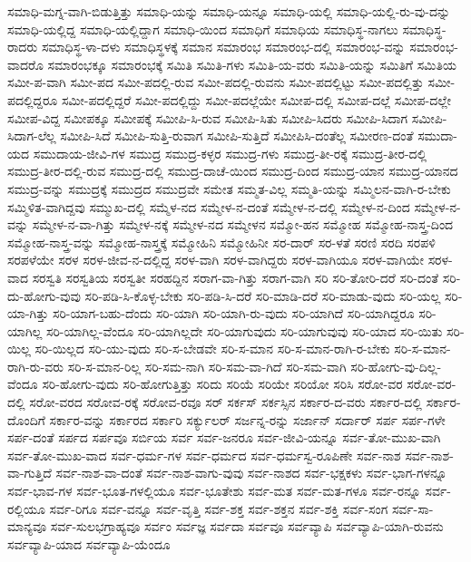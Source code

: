 {ಸಮಾಧಿ-ಮಗ್ನ-ವಾಗಿ-ಬಿಡುತ್ತಿತ್ತು
ಸಮಾಧಿ-ಯನ್ನು
ಸಮಾಧಿ-ಯನ್ನೂ
ಸಮಾಧಿ-ಯಲ್ಲಿ
ಸಮಾಧಿ-ಯಲ್ಲಿ-ರು-ವು-ದನ್ನು
ಸಮಾಧಿ-ಯಲ್ಲಿದ್ದ
ಸಮಾಧಿ-ಯಲ್ಲಿದ್ದಾಗ
ಸಮಾಧಿ-ಯಿಂದ
ಸಮಾಧಿಗೆ
ಸಮಾಧಿಯ
ಸಮಾಧಿಸ್ಥ-ನಾಗಲು
ಸಮಾಧಿಸ್ಥ-ರಾದರು
ಸಮಾಧಿಸ್ಥ-ಳಾ-ದಳು
ಸಮಾಧಿಸ್ಥಳಕ್ಕೆ
ಸಮಾನ
ಸಮಾರಂಭ
ಸಮಾರಂಭ-ದಲ್ಲಿ
ಸಮಾರಂಭ-ವನ್ನು
ಸಮಾರಂಭ-ವಾದರೊ
ಸಮಾರಂಭಕ್ಕೂ
ಸಮಾರಂಭಕ್ಕೆ
ಸಮಿತಿ
ಸಮಿತಿ-ಗಳು
ಸಮಿತಿ-ಯ-ವರು
ಸಮಿತಿ-ಯನ್ನು
ಸಮಿತಿಗೆ
ಸಮಿತಿಯ
ಸಮೀ-ಪ-ವಾಗಿ
ಸಮೀ-ಪದ
ಸಮೀ-ಪದಲ್ಲಿ-ರುವ
ಸಮೀ-ಪದಲ್ಲಿ-ರುವನು
ಸಮೀ-ಪದಲ್ಲಿಟ್ಟು
ಸಮೀ-ಪದಲ್ಲಿತ್ತು
ಸಮೀ-ಪದಲ್ಲಿದ್ದರೂ
ಸಮೀ-ಪದಲ್ಲಿದ್ದರೆ
ಸಮೀ-ಪದಲ್ಲಿದ್ದು
ಸಮೀ-ಪದಲ್ಲೆಯೇ
ಸಮೀಪ-ದಲ್ಲಿ
ಸಮೀಪ-ದಲ್ಲೆ
ಸಮೀಪ-ದಲ್ಲೇ
ಸಮೀಪ-ವಿದ್ದ
ಸಮೀಪಕ್ಕೂ
ಸಮೀಪಕ್ಕೆ
ಸಮೀಪಿ-ಸಿ-ರುವ
ಸಮೀಪಿ-ಸಿತು
ಸಮೀಪಿ-ಸಿದರು
ಸಮೀಪಿ-ಸಿದಾಗ
ಸಮೀಪಿ-ಸಿದಾಗ-ಲೆಲ್ಲ
ಸಮೀಪಿ-ಸಿದೆ
ಸಮೀಪಿ-ಸುತ್ತಿ-ರುವಾಗ
ಸಮೀಪಿ-ಸುತ್ತಿದೆ
ಸಮೀಪಿಸಿ-ದಂತೆಲ್ಲ
ಸಮೀರಣ-ದಂತೆ
ಸಮುದಾ-ಯದ
ಸಮುದಾಯ-ಜೀವಿ-ಗಳ
ಸಮುದ್ರ
ಸಮುದ್ರ-ಕಳ್ಳರ
ಸಮುದ್ರ-ಗಳು
ಸಮುದ್ರ-ತೀ-ರಕ್ಕೆ
ಸಮುದ್ರ-ತೀರ-ದಲ್ಲಿ
ಸಮುದ್ರ-ತೀರ-ದಲ್ಲಿ-ರುವ
ಸಮುದ್ರ-ದಲ್ಲಿ
ಸಮುದ್ರ-ದಾಚೆ-ಯಿಂದ
ಸಮುದ್ರ-ದಿಂದ
ಸಮುದ್ರ-ಯಾನ
ಸಮುದ್ರ-ಯಾನದ
ಸಮುದ್ರ-ವನ್ನು
ಸಮುದ್ರಕ್ಕೆ
ಸಮುದ್ರದ
ಸಮುದ್ರವೇ
ಸಮೇತ
ಸಮ್ಮತ-ವಿಲ್ಲ
ಸಮ್ಮತಿ-ಯನ್ನು
ಸಮ್ಮಿಲನ-ವಾಗಿ-ರ-ಬೇಕು
ಸಮ್ಮಿಳಿತ-ವಾಗಿದ್ದವು
ಸಮ್ಮುಖ-ದಲ್ಲಿ
ಸಮ್ಮೆಳ-ನದ
ಸಮ್ಮೇಳ-ನ-ದಂತೆ
ಸಮ್ಮೇಳ-ನ-ದಲ್ಲಿ
ಸಮ್ಮೇಳ-ನ-ದಿಂದ
ಸಮ್ಮೇಳ-ನ-ವನ್ನು
ಸಮ್ಮೇಳ-ನ-ವಾ-ಗಿತ್ತು
ಸಮ್ಮೇಳ-ನಕ್ಕೆ
ಸಮ್ಮೇಳ-ನದ
ಸಮ್ಮೇಳನ
ಸಮ್ಮೋ-ಹನ
ಸಮ್ಮೋಹ
ಸಮ್ಮೋಹ-ನಾಸ್ತ್ರ-ದಿಂದ
ಸಮ್ಮೋಹ-ನಾಸ್ತ್ರ-ವನ್ನು
ಸಮ್ಮೋಹ-ನಾಸ್ತ್ರಕ್ಕೆ
ಸಮ್ಮೋಹಿನಿ
ಸಮ್ಮೋಹಿನೀ
ಸರ-ದಾರ್
ಸರ-ಳತೆ
ಸರಣಿ
ಸರದಿ
ಸರಪಳಿ
ಸರಪಳೆಯೇ
ಸರಳ
ಸರಳ-ಜೀವ-ನ-ದಲ್ಲಿದ್ದ
ಸರಳ-ವಾಗಿ
ಸರಳ-ವಾಗಿದ್ದರು
ಸರಳ-ವಾಗಿಯೂ
ಸರಳ-ವಾಗಿಯೇ
ಸರಳ-ವಾದ
ಸರಸ್ವತಿ
ಸರಸ್ವತಿಯ
ಸರಸ್ವತೀ
ಸರಹದ್ದಿನ
ಸರಾಗ-ವಾ-ಗಿತ್ತು
ಸರಾಗ-ವಾಗಿ
ಸರಿ
ಸರಿ-ತೋರಿ-ದರೆ
ಸರಿ-ದಂತೆ
ಸರಿ-ದು-ಹೋಗು-ವುವು
ಸರಿ-ಪಡಿ-ಸಿ-ಕೊಳ್ಳ-ಬೇಕು
ಸರಿ-ಪಡಿ-ಸಿ-ದರೆ
ಸರಿ-ಮಾಡಿ-ದರೆ
ಸರಿ-ಮಾಡು-ವುದು
ಸರಿ-ಯಲ್ಲ
ಸರಿ-ಯಾ-ಗಿತ್ತು
ಸರಿ-ಯಾಗ-ಬಹು-ದೆಂದು
ಸರಿ-ಯಾಗಿ
ಸರಿ-ಯಾಗಿ-ರು-ವುದು
ಸರಿ-ಯಾಗಿದೆ
ಸರಿ-ಯಾಗಿದ್ದರೂ
ಸರಿ-ಯಾಗಿಲ್ಲ
ಸರಿ-ಯಾಗಿಲ್ಲ-ವೆಂದೂ
ಸರಿ-ಯಾಗಿಲ್ಲದೇ
ಸರಿ-ಯಾಗುವುದು
ಸರಿ-ಯಾಗುವುವು
ಸರಿ-ಯಾದ
ಸರಿ-ಯಿತು
ಸರಿ-ಯಿಲ್ಲ
ಸರಿ-ಯಿಲ್ಲದ
ಸರಿ-ಯು-ವುದು
ಸರಿ-ಸ-ಬೇಡವೇ
ಸರಿ-ಸ-ಮಾನ
ಸರಿ-ಸ-ಮಾನ-ರಾಗಿ-ರ-ಬೇಕು
ಸರಿ-ಸ-ಮಾನ-ರಾಗಿ-ರು-ವರು
ಸರಿ-ಸ-ಮಾನ-ರಿಲ್ಲ
ಸರಿ-ಸಮ-ನಾಗಿ
ಸರಿ-ಸಮ-ವಾ-ಗಿದೆ
ಸರಿ-ಸಮ-ವಾಗಿ
ಸರಿ-ಹೋಗು-ವು-ದಿಲ್ಲ-ವೆಂದೂ
ಸರಿ-ಹೋಗು-ವುದು
ಸರಿ-ಹೋಗುತ್ತಿತ್ತು
ಸರಿದು
ಸರಿಯೆ
ಸರಿಯೇ
ಸರಿಯೋ
ಸರಿಸಿ
ಸರೋ-ವರ
ಸರೋ-ವರ-ದಲ್ಲಿ
ಸರೋ-ವರದ
ಸರೋವ-ರಕ್ಕೆ
ಸರೋವ-ರವೂ
ಸರ್
ಸರ್ಕಸ್
ಸರ್ಕಸ್ಸಿನ
ಸರ್ಕಾರ-ದ-ವರು
ಸರ್ಕಾರ-ದಲ್ಲಿ
ಸರ್ಕಾರ-ದೊಂದಿಗೆ
ಸರ್ಕಾರ-ವನ್ನು
ಸರ್ಕಾರದ
ಸರ್ಕಾರಿ
ಸರ್ಕ್ಯುಲರ್
ಸರ್ಜನ್ನ-ರನ್ನು
ಸರ್ಜಾನ್
ಸರ್ದಾರ್
ಸರ್ಪ
ಸರ್ಪ-ಗಳೇ
ಸರ್ಪ-ದಂತೆ
ಸರ್ಪದ
ಸರ್ಪವೂ
ಸರ್ಬಿಯ
ಸರ್ವ
ಸರ್ವ-ಜನರೂ
ಸರ್ವ-ಜೀವಿ-ಯನ್ನೂ
ಸರ್ವ-ತೋ-ಮುಖ-ವಾಗಿ
ಸರ್ವ-ತೋ-ಮುಖ-ವಾದ
ಸರ್ವ-ಧರ್ಮ-ಗಳ
ಸರ್ವ-ಧರ್ಮದ
ಸರ್ವ-ಧರ್ಮಸ್ವ-ರೂಪಿಣೇ
ಸರ್ವ-ನಾಶ
ಸರ್ವ-ನಾಶ-ವಾ-ಗುತ್ತಿದೆ
ಸರ್ವ-ನಾಶ-ವಾ-ದಂತೆ
ಸರ್ವ-ನಾಶ-ವಾಗು-ವುವು
ಸರ್ವ-ನಾಶದ
ಸರ್ವ-ಭಕ್ಷಕಳು
ಸರ್ವ-ಭಾಗ-ಗಳನ್ನೂ
ಸರ್ವ-ಭಾವ-ಗಳ
ಸರ್ವ-ಭೂತ-ಗಳಲ್ಲಿಯೂ
ಸರ್ವ-ಭೂತೇಶು
ಸರ್ವ-ಮತ
ಸರ್ವ-ಮತ-ಗಳೂ
ಸರ್ವ-ರನ್ನೂ
ಸರ್ವ-ರಲ್ಲಿಯೂ
ಸರ್ವ-ರಿಗೂ
ಸರ್ವ-ವನ್ನೂ
ಸರ್ವ-ವೃತ್ತಿ
ಸರ್ವ-ಶಕ್ತ
ಸರ್ವ-ಶಕ್ತನ
ಸರ್ವ-ಶಕ್ತಿ
ಸರ್ವ-ಸಂಗ
ಸರ್ವ-ಸಾ-ಮಾನ್ಯವೂ
ಸರ್ವ-ಸುಲಭಗ್ರಾಹ್ಯವೂ
ಸರ್ವಂ
ಸರ್ವಜ್ಞ
ಸರ್ವದಾ
ಸರ್ವವೂ
ಸರ್ವವ್ಯಾಪಿ
ಸರ್ವವ್ಯಾಪಿ-ಯಾಗಿ-ರುವನು
ಸರ್ವವ್ಯಾಪಿ-ಯಾದ
ಸರ್ವವ್ಯಾಪಿ-ಯೆಂದೂ
}
